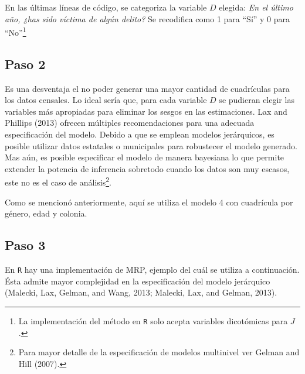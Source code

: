 \documentclass[]{article}
\let\rmarkdownfootnote\footnote%
\def\footnote{\protect\rmarkdownfootnote}
\begin{document}
En las últimas líneas de código, se categoriza la variable $D$ elegida:
\emph{En el último año, ¿has sido víctima de algún delito?} Se
recodifica como 1 para ``Sí'' y 0 para ``No''\footnote{La implementación
  del método en \texttt{R} solo acepta variables dicotómicas para $J$.}

\subsection{Paso 2}\label{paso-2}

Es una desventaja el no poder generar una mayor cantidad de cuadrículas
para los datos censales. Lo ideal sería que, para cada variable $D$ se
pudieran elegir las variables más apropiadas para eliminar los sesgos en
las estimaciones. Lax and Phillips (2013) ofrecen múltiples
recomendaciones para una adecuada especificación del modelo. Debido a
que se emplean modelos jerárquicos, es posible utilizar datos estatales
o municipales para robustecer el modelo generado. Mas aún, es posible
especificar el modelo de manera bayesiana lo que permite extender la
potencia de inferencia sobretodo cuando los datos son muy escasos, este
no es el caso de análisis\footnote{Para mayor detalle de la
  especificación de modelos multinivel ver Gelman and Hill (2007).}.

Como se mencionó anteriormente, aquí se utiliza el modelo 4 con
cuadrícula por género, edad y colonia.

\subsection{Paso 3}\label{paso-3}

En \texttt{R} hay una implementación de MRP, ejemplo del cuál se utiliza
a continuación. Ésta admite mayor complejidad en la especificación del
modelo jerárquico (Malecki, Lax, Gelman, and Wang, 2013; Malecki, Lax,
and Gelman, 2013).
\end{document}
